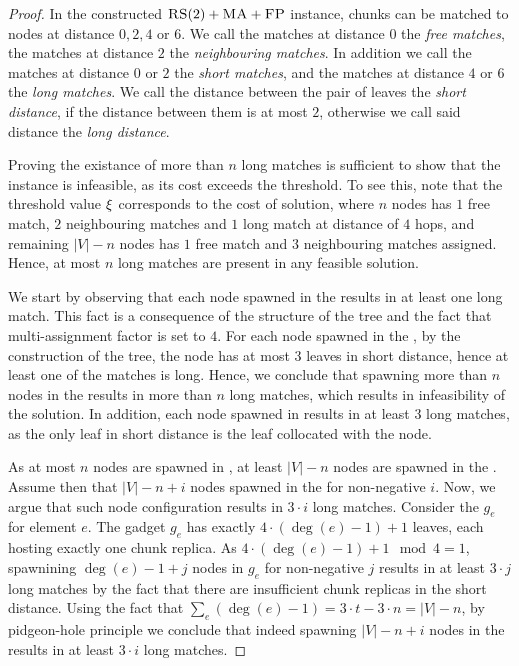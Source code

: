 \begin{proof}
  In the constructed $\textsc{RS}(2)+\textsc{MA}+\textsc{FP}$ instance, chunks can be matched to nodes at distance $0, 2, 4$ or $6$.
  We call the matches at distance $0$ the \emph{free matches}, the matches at distance $2$ the \emph{neighbouring matches}.
  In addition we call the matches at distance $0$ or $2$ the \emph{short matches}, and the matches at distance $4$ or $6$ the \emph{long matches}.
  We call the distance between the pair of leaves the \emph{short distance}, if the distance between them is at most $2$, otherwise we call said distance the \emph{long distance}.

Proving the existance of more than $n$ long matches is sufficient to show that the instance is infeasible, as its cost exceeds the threshold.
To see this, note that the threshold value $\xi$ corresponds to the cost of solution, where $n$ nodes has $1$ free match, $2$ neighbouring matches and $1$ long match at distance of $4$ hops, and remaining $|V|-n$ nodes has $1$ free match and $3$ neighbouring matches assigned.
Hence, at most $n$ long matches are present in any feasible solution.

We start by observing that each node spawned in the \MatchSubtree{} results in at least one long match.
This fact is a consequence of the structure of the tree and the fact that multi-assignment factor is set to $4$.
For each node spawned in the \MatchSubtree{}, by the construction of the tree, the node has at most $3$ leaves in short distance, hence at least one of the matches is long.
Hence, we conclude that spawning more than $n$ nodes in the \MatchSubtree{} results in more than $n$ long matches, which results in infeasibility of the solution.
In addition, each node spawned in \UnqGadget{} results in at least $3$ long matches, as the only leaf in short distance is the leaf collocated with the node.

As at most $n$ nodes are spawned in \MatchSubtree{}, at least $|V|-n$ nodes are spawned in the \CoverSubtree.
Assume then that $|V|-n+i$ nodes spawned in the \CoverSubtree{} for non-negative $i$.
Now, we argue that such node configuration results in $3\cdot i$ long matches.
Consider the \ElGadget{} $g_e$ for element $e$.
The gadget $g_e$ has exactly $4\cdot(\deg(e)-1)+1$ leaves, each hosting exactly one chunk replica.
As $4\cdot(\deg(e)-1)+1 \mod 4 = 1$, spawnining $\deg(e)-1+j$ nodes in $g_e$ for non-negative $j$ results in at least $3\cdot j$ long matches by the fact that there are insufficient chunk replicas in the short distance.
Using the fact that $\sum_e(\deg(e)-1) = 3\cdot t - 3\cdot n = |V| - n$, by pidgeon-hole principle we conclude that indeed spawning $|V|-n+i$ nodes in the \CoverSubtree{} results in at least $3\cdot i$ long matches.


\end{proof}
